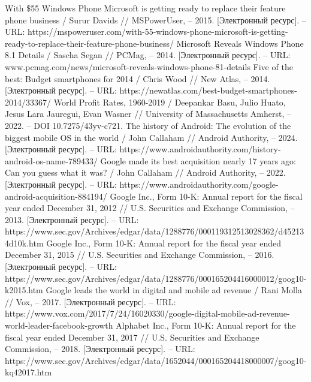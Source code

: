 \documentclass{article}
\begin{document}
\begin{thebibliography}{2}
 With \$55 Windows Phone Microsoft is getting ready to replace their feature phone business / Surur Davids // MSPowerUser, – 2015. [Электронный ресурс]. – URL: https://mspoweruser.com/with-55-windows-phone-microsoft-is-getting-ready-to-replace-their-feature-phone-business/
 Microsoft Reveals Windows Phone 8.1 Details / Sascha Segan // PCMag, – 2014. [Электронный ресурс]. – URL: www.pcmag.com/news/microsoft-reveals-windows-phone-81-details
 Five of the best: Budget smartphones for 2014 / Chris Wood // New Atlas, – 2014. [Электронный ресурс]. – URL: https://newatlas.com/best-budget-smartphones-2014/33367/
 World Profit Rates, 1960-2019 / Deepankar Basu, Julio Huato, Jesus Lara Jauregui, Evan Wasner // University of Massachusetts Amherst, – 2022. – DOI 10.7275/43yv-c721.
 The history of Android: The evolution of the biggest mobile OS in the world / John Callaham // Android Authority, – 2024. [Электронный ресурс]. – URL: https://www.androidauthority.com/history-android-os-name-789433/
 Google made its best acquisition nearly 17 years ago: Can you guess what it was? / John Callaham // Android Authority, – 2022. [Электронный ресурс]. – URL: https://www.androidauthority.com/google-android-acquisition-884194/
 Google Inc., Form 10-K: Annual report for the fiscal year ended December 31, 2012 // U.S. Securities and Exchange Commission, – 2013. [Электронный ресурс]. – URL: https://www.sec.gov/Archives/edgar/data/1288776/000119312513028362/d452134d10k.htm
 Google Inc., Form 10-K: Annual report for the fiscal year ended December 31, 2015 // U.S. Securities and Exchange Commission, – 2016. [Электронный ресурс]. – URL: https://www.sec.gov/Archives/edgar/data/1288776/000165204416000012/goog10-k2015.htm
 Google leads the world in digital and mobile ad revenue / Rani Molla // Vox, – 2017. [Электронный ресурс]. – URL: https://www.vox.com/2017/7/24/16020330/google-digital-mobile-ad-revenue-world-leader-facebook-growth
 Alphabet Inc., Form 10-K: Annual report for the fiscal year ended December 31, 2017 // U.S. Securities and Exchange Commission, – 2018. [Электронный ресурс]. – URL: https://www.sec.gov/Archives/edgar/data/1652044/000165204418000007/goog10-kq42017.htm
\end{thebibliography} 
\end{document}
